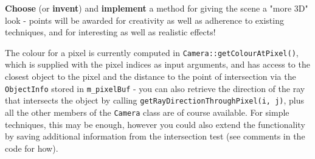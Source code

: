 \documentclass{../../../fal_assignment}
\begin{document}
\textbf{Choose} (or \textbf{invent}) and \textbf{implement} a method for giving the scene a "more 3D" look - points will be awarded for creativity as well as adherence to existing techniques, and for interesting as well as realistic effects!

The colour for a pixel is currently computed in \lstinline{Camera::getColourAtPixel()}, which is supplied with the pixel indices as input arguments, and has access to the closest object to the pixel and the distance to the point of intersection via the \lstinline{ObjectInfo} stored in \lstinline{m_pixelBuf} - you can also retrieve the direction of the ray that intersects the object by calling \lstinline{getRayDirectionThroughPixel(i, j)}, plus all the other members of the \lstinline{Camera} class are of course available. For simple techniques, this may be enough, however you could also extend the functionality by saving additional information from the intersection test (see comments in the code for how).
\end{document}
